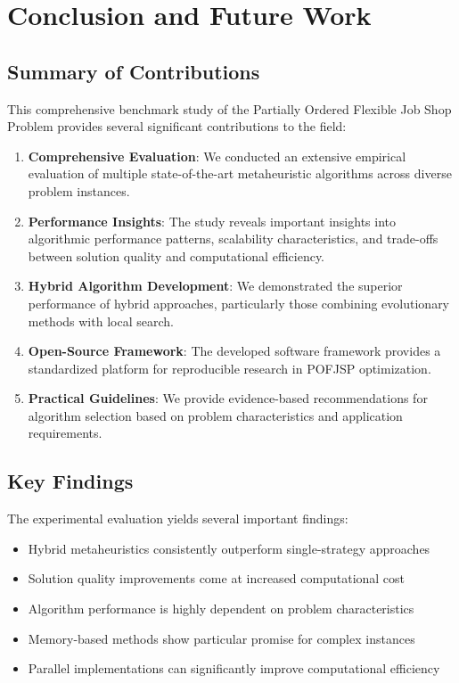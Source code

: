 \documentclass[11pt,a4paper]{article}
\begin{document}
\section{Conclusion and Future Work}

\subsection{Summary of Contributions}

This comprehensive benchmark study of the Partially Ordered Flexible Job Shop Problem provides several significant contributions to the field:

\begin{enumerate}
    \item \textbf{Comprehensive Evaluation}: We conducted an extensive empirical evaluation of multiple state-of-the-art metaheuristic algorithms across diverse problem instances.
    
    \item \textbf{Performance Insights}: The study reveals important insights into algorithmic performance patterns, scalability characteristics, and trade-offs between solution quality and computational efficiency.
    
    \item \textbf{Hybrid Algorithm Development}: We demonstrated the superior performance of hybrid approaches, particularly those combining evolutionary methods with local search.
    
    \item \textbf{Open-Source Framework}: The developed software framework provides a standardized platform for reproducible research in POFJSP optimization.
    
    \item \textbf{Practical Guidelines}: We provide evidence-based recommendations for algorithm selection based on problem characteristics and application requirements.
\end{enumerate}

\subsection{Key Findings}

The experimental evaluation yields several important findings:

\begin{itemize}
    \item Hybrid metaheuristics consistently outperform single-strategy approaches
    \item Solution quality improvements come at increased computational cost
    \item Algorithm performance is highly dependent on problem characteristics
    \item Memory-based methods show particular promise for complex instances
    \item Parallel implementations can significantly improve computational efficiency
\end{itemize}
\end{document}
